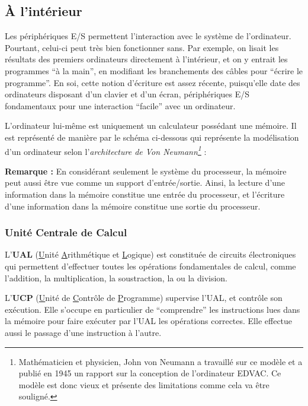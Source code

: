 \documentclass[../../main.tex]{subfiles}
\begin{document}
\subsection{À l'intérieur}
\label{sub:_l_int_rieur}
Les périphériques E/S permettent l'interaction avec le système de l'ordinateur. Pourtant, celui-ci peut très bien fonctionner sans. Par exemple, on lisait les résultats des premiers ordinateurs directement à l'intérieur, et on y entrait les programmes ``à la main'', en modifiant les branchements des câbles pour ``écrire le programme''. En soi, cette notion d'écriture est assez récente, puisqu'elle date des ordinateurs disposant d'un clavier et d'un écran, périphériques E/S fondamentaux pour une interaction ``facile'' avec un ordinateur.

L'ordinateur lui-même est uniquement un calculateur possédant une mémoire. Il est représenté de manière par le schéma ci-dessous qui représente la modélisation d'un ordinateur selon l'\textit{architecture de Von Neumann\footnote{Mathématicien et physicien, John von Neumann a travaillé sur ce modèle et a publié en 1945 un rapport sur la conception de l'ordinateur EDVAC. Ce modèle est donc vieux et présente des limitations comme cela va être souligné.}} :
\begin{center}
  
\end{center}
\textbf{Remarque :} En considérant seulement le système du processeur, la mémoire peut aussi être vue comme un support d'entrée/sortie. Ainsi, la lecture d'une information dans la mémoire constitue une entrée du processeur, et l'écriture d'une information dans la mémoire constitue une sortie du processeur.

\subsubsection{Unité Centrale de Calcul}
\label{ssub:unit_centrale_de_calcul}
L'\textbf{UAL} (\underline{U}nité \underline{A}rithmétique et \underline{L}ogique) est constituée de circuits électroniques qui permettent d'effectuer toutes les opérations fondamentales de calcul, comme l'addition, la multiplication, la soustraction, la ou la division.

L'\textbf{UCP} (\underline{U}nité de \underline{C}ontrôle de \underline{P}rogramme) supervise l'UAL, et contrôle son exécution. Elle s'occupe en particulier de ``comprendre'' les instructions lues dans la mémoire pour faire exécuter par l'UAL les opérations correctes. Elle effectue aussi le passage d'une instruction à l'autre.
\end{document}
